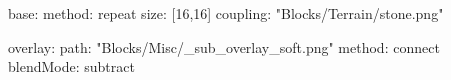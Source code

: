 base:
  method: repeat
  size: [16,16]
  coupling: "Blocks/Terrain/stone.png"

overlay:
  path: "Blocks/Misc/_sub_overlay_soft.png"
  method: connect
blendMode: subtract

